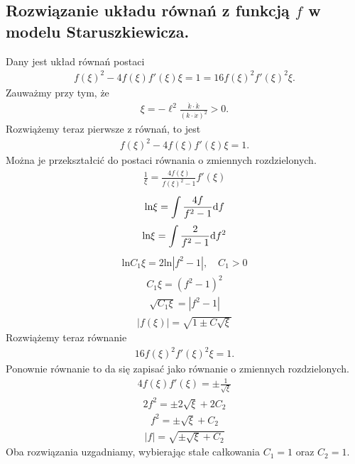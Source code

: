 \subsection{Rozwiązanie układu równań z 
funkcją $f$ w modelu Staruszkiewicza.}
\noindent
Dany jest układ równań postaci 
\begin{align*} 
 f(\xi)^2- 4 f(\xi) f'(\xi) \xi
 =  1 =
  16   f(\xi)^2 f'(\xi)^2 \xi .
\end{align*}
Zauważmy przy tym, że 
\begin{align*}
\xi = - \ell^2 \frac{\dot{k} \cdot \dot{k}}{ ( k \cdot \dot{x})^2 } > 0.
\end{align*}
Rozwiążemy teraz pierwsze z równań, to jest
\begin{align*} 
 f(\xi)^2- 4 f(\xi) f'(\xi) \xi =  1 .
\end{align*}
Można je przekształcić do postaci równania o zmiennych 
rozdzielonych.
\begin{align*} 
\frac{1}{\xi} = \frac{ 4 f(\xi) }{ f(\xi)^2-1} f'(\xi) 
\end{align*}
\begin{align*} 
\text{ln} \xi = \int \frac{ 4 f }{ f^2-1} \text{d} f 
\end{align*}
\begin{align*} 
\text{ln} \xi = \int \frac{ 2 }{ f^2-1} \text{d} f^2 
\end{align*}
\begin{align*} 
\text{ln} C_1 \xi = 2\text{ln}|f^2-1|, \quad C_1>0
\end{align*}
\begin{align*} 
 C_1 \xi  = (f^2-1)^2 
\end{align*}
\begin{align*} 
 \sqrt{ C_1 \xi}  = | f^2-1 | 
\end{align*}
\begin{align*} 
|f(\xi)| =  \sqrt{ 1 \pm C\sqrt{ \xi} } 
\end{align*}
Rozwiążemy teraz równanie
\begin{align*} 
  16   f(\xi)^2 f'(\xi)^2 \xi  = 1.
\end{align*}
Ponownie równanie to da się zapisać jako równanie o 
zmiennych rozdzielonych.
\begin{align*} 
  4  f(\xi) f'(\xi)   =\pm \frac{1}{\sqrt{\xi}}
\end{align*}
\begin{align*} 
  2 f^2   =\pm 2 \sqrt{\xi} + 2 C_2
\end{align*}
\begin{align*} 
   f^2   =\pm  \sqrt{\xi} + C_2
\end{align*}
\begin{align*} 
   |f|   =\sqrt{ \pm  \sqrt{\xi} + C_2 }
\end{align*}
Oba rozwiązania uzgadniamy, wybierając 
stałe całkowania $C_1 = 1$ oraz $C_2=1$.



